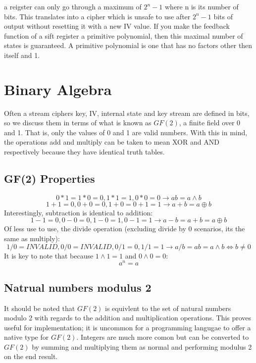\documentclass{report}
\begin{document}
a reigster can only go through a maximum of $2^n-1$ where n is its number of bits. This translates into a cipher which is unsafe to use after $2^n-1$ bits of output without resetting it with a new IV value. If you make the feedback function of a sift register a primitive polynomial, then this maximal number of states is guaranteed. A primitive polynomial is one that has no factors other then itself and 1.

\section{Binary Algebra}
Often a stream ciphers key, IV, internal state and key stream are defined in bits, so we discuss them in terms of what is known as $\mathit{GF(2)}$, a finite field over 0 and 1. That is, only the values of 0 and 1 are valid numbers. With this in mind, the operations add and multiply can be taken to mean XOR and AND respectively because they have identical truth tables.

\subsection{GF(2) Properties}
\begin{equation} \label{eq:GFtimes}
0*1 = 1*0=0, 1*1=1, 0*0=0 \to ab = a \land b
\end{equation}
\begin{equation} \label{eq:GFadd}
1+1=0, 0+0=0, 1+0=0+1=1 \to a+b = a \oplus b
\end{equation}
Interestingly, subtraction is identical to addition:
\begin{equation} \label{eq:GFminus}
1-1=0, 0-0=0, 1-0=1, 0-1=1 \to a-b = a+b = a \oplus b
\end{equation}
Of less use to use, the divide operation (excluding divide by 0 scenarios, its the same as multiply):
\begin{equation} \label{eq:GFdivide}
1/0=\mathit{INVALID}, 0/0=\mathit{INVALID}, 0/1=0, 1/1=1 \to a/b = ab = a \land b \iff b \neq 0
\end{equation}
It is key to note that because $1\land1=1$ and $0\land0 = 0$:
\begin{equation} \label{eq:GFpowers}
a^n = a
\end{equation}

\subsection{Natrual numbers modulus 2}
It should be noted that $\mathit{GF(2)}$ is equivlent to the set of natural numbers modulo 2 with regards to the addition and multiplication operations. This proves useful for implementation; it is uncommon for a programming langugae to offer a native type for $\mathit{GF(2)}$. Integers are much more comon but can be converted to $\mathit{GF(2)}$ by summing and multiplying them as normal and performing modulus 2 on the end result.
\end{document}
